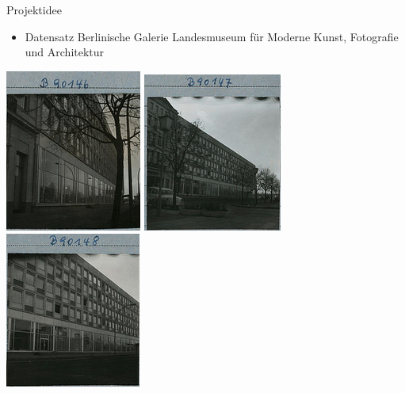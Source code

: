 \documentclass[ucs,9pt]{beamer}
\begin{document}
\begin{frame}{Projektidee}
	\begin{itemize}
  		\item Datensatz Berlinische Galerie Landesmuseum für Moderne Kunst, Fotografie und Architektur\\[1cm]
	\end{itemize}
	\includegraphics[scale=0.5]{bild1.png}  
	\vspace*{1cm}
	\includegraphics[scale=0.5]{bild2.png} 
	\vspace*{1cm} 
	\includegraphics[scale=0.5]{bild3.png}  
\end{frame}
\end{document}
